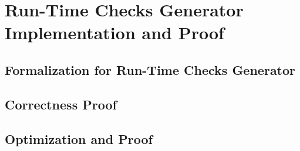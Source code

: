 \section{Run-Time Checks Generator Implementation and Proof}
\subsection{Formalization for Run-Time Checks Generator}

\subsection{Correctness Proof}

\subsection{Optimization and Proof}